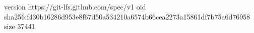 version https://git-lfs.github.com/spec/v1
oid sha256:f430b16286d953e8f67d50a534210a6574b66cea2273a15861df7b75a6d76958
size 37441
